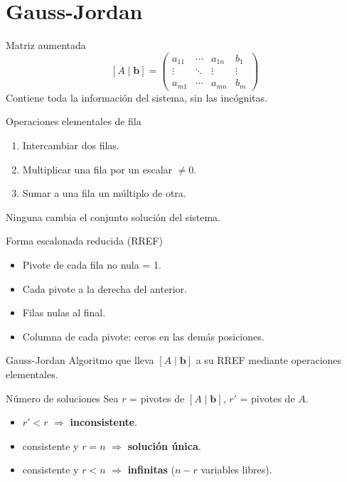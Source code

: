 \documentclass[11pt]{beamer}
\newcommand{\vv}[1]{\mathbf{#1}}
\begin{document}
\section{Gauss-Jordan}


\begin{frame}{Matriz aumentada}
  \[
    [A\mid\vv{b}] =
    \left(\begin{array}{ccc|c}
      a_{11} & \cdots & a_{1n} & b_1 \\
      \vdots & \ddots & \vdots & \vdots \\
      a_{m1} & \cdots & a_{mn} & b_m
    \end{array}\right)
  \]
  Contiene toda la información del sistema, sin las incógnitas.
\end{frame}

\begin{frame}{Operaciones elementales de fila}
  \begin{enumerate}
    \item Intercambiar dos filas.
    \item Multiplicar una fila por un escalar $\neq 0$.
    \item Sumar a una fila un múltiplo de otra.
  \end{enumerate}
  \vfill
  Ninguna cambia el conjunto solución del sistema.
\end{frame}

\begin{frame}{Forma escalonada reducida (RREF)}
  \begin{itemize}
    \item Pivote de cada fila no nula = 1.
    \item Cada pivote a la derecha del anterior.
    \item Filas nulas al final.
    \item Columna de cada pivote: ceros en las demás posiciones.
  \end{itemize}
  \begin{alertblock}{Gauss-Jordan}
    Algoritmo que lleva $[A\mid\vv{b}]$ a su RREF mediante operaciones elementales.
  \end{alertblock}
\end{frame}

\begin{frame}{Número de soluciones}
  Sea $r$ = pivotes de $[A\mid\vv{b}]$, $r'$ = pivotes de $A$.
  \begin{itemize}
    \item $r' < r$ $\Rightarrow$ \textbf{inconsistente}.
    \item consistente y $r=n$ $\Rightarrow$ \textbf{solución única}.
    \item consistente y $r<n$ $\Rightarrow$ \textbf{infinitas} ($n-r$ variables libres).
  \end{itemize}
\end{frame}
\end{document}
